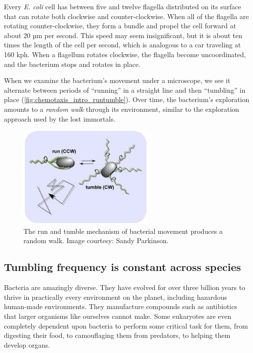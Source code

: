 Every \textit{E. coli} cell has between five and twelve flagella distributed on its surface that can rotate both clockwise and counter-clockwise. When all of the flagella are rotating counter-clockwise, they form a bundle and propel the cell forward at about 20 µm per second. This speed may seem insignificant, but it is about ten times the length of the cell per second, which is analogous to a car traveling at 160 kph. When a flagellum rotates clockwise, the flagella become uncoordinated, and the bacterium stops and rotates in place.

When we examine the bacterium's movement under a microscope, we see it alternate between periods of ``running'' in a straight line and then ``tumbling'' in place (\autoref{fig:chemotaxis_intro_runtumble}). Over time, the bacterium's  exploration amounts to a \textit{random walk} through its environment, similar to the exploration approach used by the lost immortals.\\

\begin{figure}[h]
\centering
\mySfFamily
\includegraphics[width = 0.6\textwidth]{../images/chemotaxis_intro_runtumble.png}
\caption{The run and tumble mechanism of bacterial movement produces a random walk. Image courtesy: Sandy Parkinson.}
\label{fig:chemotaxis_intro_runtumble}
\end{figure}

\FloatBarrier
{}
\subsection{Tumbling frequency is constant across species}

Bacteria are amazingly diverse. They have evolved for over three billion years to thrive in practically every environment on the planet, including hazardous human-made environments. They manufacture compounds such as antibiotics that larger organisms like ourselves cannot make. Some eukaryotes are even completely dependent upon bacteria to perform some critical task for them, from digesting their food, to camouflaging them from predators, to helping them develop organs.

